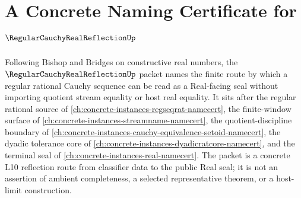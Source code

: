 \chapter{A Concrete Naming Certificate for $\RegularCauchyRealReflectionUp$}
\label{ch:concrete-instances-regular-cauchy-real-reflection-namecert}

Following Bishop and Bridges on constructive real numbers, the $\RegularCauchyRealReflectionUp$ packet names the finite route by which a regular rational Cauchy sequence can be read as a Real-facing seal without importing quotient stream equality or host real equality. It sits after the regular rational source of \autoref{ch:concrete-instances-regseqrat-namecert}, the finite-window surface of \autoref{ch:concrete-instances-streamname-namecert}, the quotient-discipline boundary of \autoref{ch:concrete-instances-cauchy-equivalence-setoid-namecert}, the dyadic tolerance core of \autoref{ch:concrete-instances-dyadicratcore-namecert}, and the terminal seal of \autoref{ch:concrete-instances-real-namecert}. The packet is a concrete L10 reflection route from classifier data to the public Real seal; it is not an assertion of ambient completeness, a selected representative theorem, or a host-limit construction.

